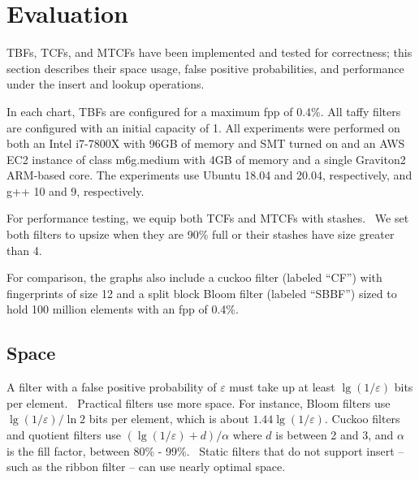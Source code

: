 \documentclass[letterpaper,twocolumn,10pt]{article}
\begin{document}

\section{Evaluation}
\label{eval}


TBFs, TCFs, and MTCFs have been implemented and tested for correctness; this section describes their space usage, false positive probabilities, and performance under the insert and lookup operations.

In each chart, TBFs are configured for a maximum fpp of 0.4\%.
All taffy filters are configured with an initial capacity of 1. %
All experiments were performed on both an Intel i7-7800X with 96GB of memory and SMT turned on and an AWS EC2 instance of class m6g.medium with 4GB of memory and a single Graviton2 ARM-based core.
The experiments use Ubuntu 18.04 and 20.04, respectively, and g++ 10 and 9, respectively.

For performance testing, we equip both TCFs and MTCFs with stashes.~\cite{stash}
We set both filters to upsize when they are 90\% full or their stashes have size greater than 4.

For comparison, the graphs also include a cuckoo filter (labeled ``CF'') with fingerprints of size 12 and a split block Bloom filter (labeled ``SBBF'') sized to hold 100 million elements with an fpp of 0.4\%.

\subsection{Space}

A filter with a false positive probability of $\varepsilon$ must take up at least $\lg (1/\varepsilon)$ bits per element.~\cite{lower-bound}
Practical filters use more space.
For instance, Bloom filters use $\lg (1/\varepsilon)/\ln 2$ bits per element, which is about $1.44 \lg (1/\varepsilon)$.
Cuckoo filters and quotient filters use $(\lg (1/\varepsilon) + d) / \alpha$ where $d$ is between 2 and 3, and $\alpha$ is the fill factor, between 80\% - 99\%.~\cite{cuckoo,quotient-filter,vector-quotient}
Static filters that do not support insert -- such as the ribbon filter -- can use nearly optimal space.~\cite{ribbon}
\end{document}
